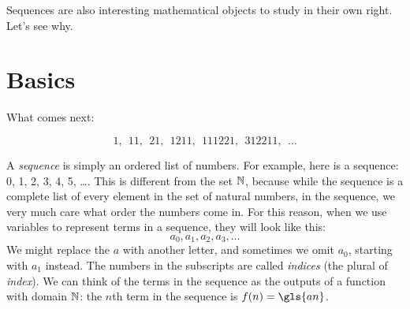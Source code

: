 \documentclass[12pt]{article}
\begin{document}
Sequences are also interesting mathematical objects to study in their own right. Let's see why.

\section{Basics}\label{sec:seq:basics}

\begin{activity}
What comes next:

\[1, ~~11, ~~21, ~~1211, ~~111221, ~~312211, ~~\ldots \]
\end{activity}

A \emph{sequence} is simply an ordered list of numbers.  For example, here is a sequence: 0, 1, 2, 3, 4, 5, \ldots.  This is different from the set $\mathbb N$, because while the sequence is a complete list of every element in the set of natural numbers, in the sequence, we very much care what order the numbers come in.  For this reason, when we use variables to represent terms in a sequence, they will look like this:
\[a_0, a_1, a_2, a_3, \ldots\]
We might replace the $a$ with another letter, and sometimes we omit $a_0$, starting with $a_1$ instead.  The numbers in the subscripts are called {\em indices} (the plural of {\em index}).  We can think of the terms in the sequence as the outputs of a function with domain $\mathbb N$: the $n$th term in the sequence is $f(n) = \gls{an}$.
\end{document}
